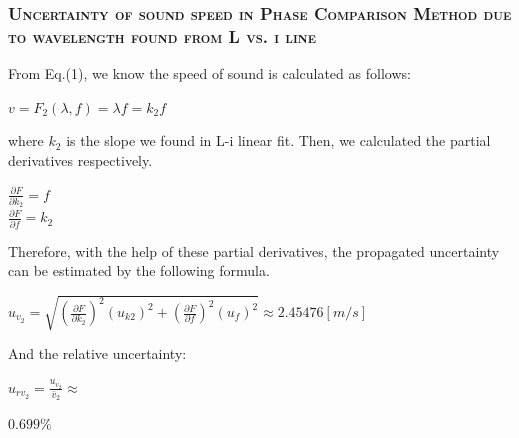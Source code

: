 \documentclass[a4paper,12pt]{article}
\begin{document}
\begin{appendices}
		\subsubsection{\textsc{Uncertainty of sound speed in Phase Comparison Method due to wavelength found from L vs. i line}}
		From Eq.(1), we know the speed of sound is calculated as follows: 
		\begin{center}
		$v = F_2(\lambda, f) = \lambda f = k_2 f$
		\end{center}
		\par
		where $k_2$ is the slope we found in L-i linear fit. Then, we calculated the partial derivatives respectively.
		\begin{center}
		$\displaystyle\frac{\partial F}{\partial k_2} = f$\\
		[3 mm]
		$\displaystyle\frac{\partial F}{\partial f} = k_2$
		\end{center}
		\par
		Therefore, with the help of these partial derivatives, the propagated uncertainty can be estimated by the following formula.
		\begin{center}
		$\displaystyle u_{v_2} = \sqrt{(\frac{\partial F}{\partial k_2})^2(u_{k2})^2 + (\frac{\partial F}{\partial f} )^2(u_{f})^2} \approx 2.45476 [m/s]$
		\end{center}
		\par
		And the relative uncertainty:
		\begin{center}
		\begin{large}
		$\displaystyle u_{rv_2} = \frac{u_{v_2}}{\bar v_2} \approx$
		\end{large}
		$ 0.699\%$
		\end{center}
		

\end{appendices}
\end{document}
